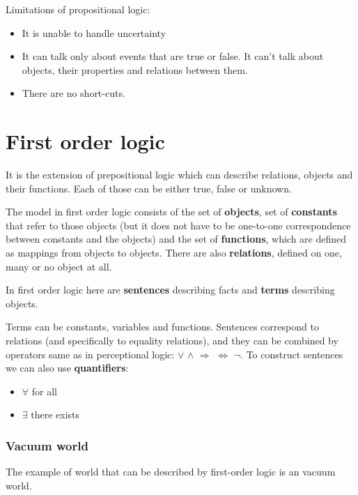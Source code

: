 \documentclass[a4paper,10pt]{article}
\begin{document}
Limitations of propositional logic:\begin{itemize}
\setlength{\itemsep}{0pt}
\setlength{\parskip}{0pt}
\setlength{\parsep}{0pt}
\item It is unable to handle uncertainty
\item It can talk only about events that are true or false. It can't talk about objects, their properties and relations between them.
\item There are no short-cuts. 
\end{itemize}

\section{First order logic}

It is the extension of prepositional logic which can describe relations, objects and their functions.  Each of those can be either true, false or unknown.

The model in first order logic consists of the set of \textbf{objects}, set of \textbf{constants} that refer to those objects (but it does not have to be one-to-one correspondence between constants and the objects) and the set of \textbf{functions}, which are defined as mappings from objects to objects. There are also \textbf{relations}, defined on one, many or no object at all.

In first order logic here are \textbf{sentences} describing facts and \textbf{terms} describing objects. 

Terms can be constants, variables and functions. Sentences correspond to relations (and specifically to equality relations), and they can be combined by operators same as in perceptional logic: $\vee$ $\wedge$ $\Rightarrow$ $\Leftrightarrow$ $\lnot$. To construct sentences we can also use \textbf{quantifiers}:
\begin{itemize}
\setlength{\itemsep}{0pt}
\setlength{\parskip}{0pt}
\setlength{\parsep}{0pt}
\item $\forall$ for all
\item $\exists$ there exists
\end{itemize}

\subsubsection*{Vacuum world}

The example of world that can be described by first-order logic is an vacuum world.
\end{document}
